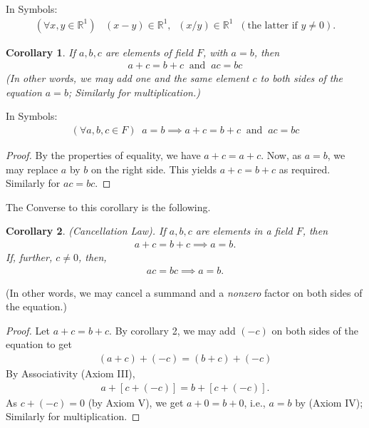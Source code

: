 \documentclass[12pt]{book}
\newtheorem{corollary}{Corollary}
\theoremstyle{definition}
\begin{document}
In Symbols:
\begin{align*}
	(\forall x,y \in \mathbb{R}^1) \;\;\; (x-y )\in \mathbb{R}^1, \;\; (x/y) \in \mathbb{R}^1 \;\; (\text{the latter if $y\neq 0$}).
\end{align*}
\begin{corollary}
	If $a,b,c$ are elements of field $F$, with $a=b$, then 
	\begin{align*}
		a+c=b+c \;\; \text{and}\;\;	ac=bc
	\end{align*}
(In other words, we may add one and the same element $c$ to both sides of the equation $a=b$; Similarly for multiplication.)
\end{corollary}
In Symbols:
\begin{align*}
	(\forall a,b,c \in F)\;\;a=b \implies a+c =b+c\;\; \text{and}\;\; ac=bc 	
\end{align*}
\begin{proof}
By the properties of equality, we have $a+c = a+c$. Now, as $a=b$, we may replace $a$ by $b$ on the right side. This yields $a+c =b+c$ as required. Similarly for $ac=bc$.
\end{proof}

The Converse to this corollary is the following.

\begin{corollary} (Cancellation Law). If $a,b,c$ are elements in a field $F$, then
\begin{align*}
a+c = b+c \implies a=b.	
\end{align*}
If, further, $c\neq 0$, then, 
\begin{align*}
ac=bc \implies a=b.	
\end{align*}
\end{corollary}
\noindent
(In other words, we may cancel a summand and a \textit{nonzero} factor on both sides of the equation.)
\begin{proof}
	Let $a+c = b+c$. By corollary 2, we may add $(-c)$ on both sides of the equation to get
	\begin{align*}
	(a+c) +(-c) = (b+c) + (-c)	
	\end{align*}
 By Associativity (Axiom III),
 \begin{align*}
 a+[c +(-c)]=b+[c+(-c)].	
 \end{align*}
As $c+(-c) =0$ (by Axiom V), we get $a+0=b+0$, i.e., $a=b$ by (Axiom IV); Similarly for multiplication.   
\end{proof}
\end{document}
